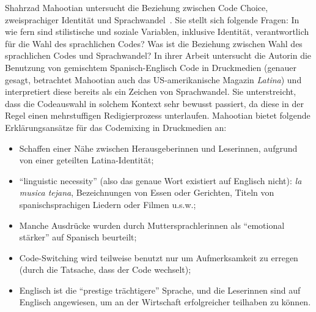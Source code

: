 Shahrzad Mahootian untersucht die Beziehung zwischen Code Choice, zweisprachiger Identität und Sprachwandel~\cite[]{Mahootian05}.
Sie stellt sich folgende Fragen: In wie fern sind stilistische und soziale Variablen, inklusive Identität, verantwortlich für die Wahl des sprachlichen Codes?
Was ist die Beziehung zwischen Wahl des sprachlichen Codes und Sprachwandel?
In ihrer Arbeit untersucht die Autorin die Benutzung von gemischtem Spanisch-Englisch Code in Druckmedien (genauer gesagt, betrachtet Mahootian auch das US-amerikanische Magazin \textit{Latina}) und interpretiert diese bereits als ein Zeichen von Sprachwandel.
Sie unterstreicht, dass die Codeauswahl in solchem Kontext sehr bewusst passiert, da diese in der Regel einen mehrstuffigen Redigierprozess unterlaufen.
Mahootian bietet folgende Erklärungsansätze für das Codemixing in Druckmedien an:
\begin{itemize}
  \item Schaffen einer Nähe zwischen Herausgeberinnen und Leserinnen, aufgrund von einer geteilten Latina-Identität;
  \item ``linguistic necessity'' (also das genaue Wort existiert auf Englisch nicht): \textit{la musica tejana}, Bezeichnungen von Essen oder Gerichten, Titeln von spanischsprachigen Liedern oder Filmen u.s.w.;
  \item Manche Ausdrücke wurden durch Muttersprachlerinnen als ``emotional stärker'' auf Spanisch beurteilt;
  \item Code-Switching wird teilweise benutzt nur um Aufmerksamkeit zu erregen (durch die Tatsache, dass der Code wechselt);
  \item Englisch ist die ``prestige trächtigere'' Sprache, und die Leserinnen sind auf Englisch angewiesen, um an der Wirtschaft erfolgreicher teilhaben zu können.
\end{itemize}



